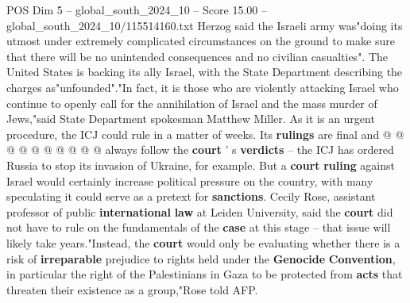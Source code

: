 \begin{textsample}{POS Dim 5 – global\_south\_2024\_10 – Score 15.00 – global\_south\_2024\_10/115514160.txt}
Herzog said the Israeli army was"doing its utmost under extremely complicated circumstances on the ground to make sure that there will be no unintended consequences and no civilian casualties".
The United States is backing its ally Israel, with the State Department describing the charges as"unfounded"."In fact, it is those who are violently attacking Israel who continue to openly call for the annihilation of Israel and the mass murder of Jews,"said State Department spokesman Matthew Miller.
As it is an urgent procedure, the ICJ could rule in a matter of weeks.
Its \textbf{rulings} are final and @ @ @ @ @ @ @ @ @ @ always follow the \textbf{court} ' s \textbf{verdicts} -- the ICJ has ordered Russia to stop its invasion of Ukraine, for example.
But a \textbf{court} \textbf{ruling} against Israel would certainly increase political pressure on the country, with many speculating it could serve as a pretext for \textbf{sanctions}.
Cecily Rose, assistant professor of public \textbf{international} \textbf{law} at Leiden University, said the \textbf{court} did not have to rule on the fundamentals of the \textbf{case} at this stage -- that issue will likely take years."Instead, the \textbf{court} would only be evaluating whether there is a risk of \textbf{irreparable} prejudice to rights held under the \textbf{Genocide} \textbf{Convention}, in particular the right of the Palestinians in Gaza to be protected from \textbf{acts} that threaten their existence as a group,"Rose told AFP.

\end{textsample}
